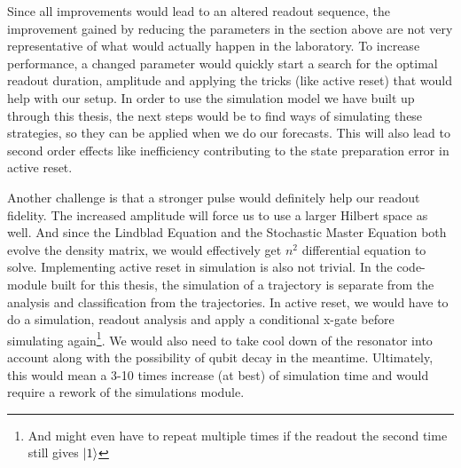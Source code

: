 Since all improvements would lead to an altered readout sequence, the improvement gained by reducing the parameters in the section above are not very representative of what would actually happen in the laboratory. To increase performance, a changed parameter would quickly start a search for the optimal readout duration, amplitude and applying the tricks (like active reset) that would help with our setup. In order to use the simulation model we have built up through this thesis, the next steps would be to find ways of simulating these strategies, so they can be applied when we do our forecasts. This will also lead to second order effects like inefficiency contributing to the state preparation error in active reset.

Another challenge is that a stronger pulse would definitely help our readout fidelity. The increased amplitude will force us to use a larger Hilbert space as well. And since the Lindblad Equation and the Stochastic Master Equation both evolve the density matrix, we would effectively get $n^2$ differential equation to solve. Implementing active reset in simulation is also not trivial. In the code-module built for this thesis, the simulation of a trajectory is separate from the analysis and classification from the trajectories. In active reset, we would have to do a simulation, readout analysis and apply a conditional x-gate  before simulating again\footnote{And might even have to repeat multiple times if the readout the second time still gives $\ket{1}$}. We would also need to take cool down of the resonator into account along with the possibility of qubit decay in the meantime.  Ultimately, this would mean a 3-10 times increase  (at best)  of simulation time and would require a rework of the simulations module.